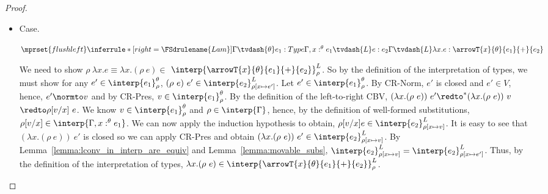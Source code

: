 \begin{proof}
\begin{itemize}
  \item[]Case.\ \\
    \begin{center}
      \begin{math}
        $$\mprset{flushleft}
        \inferrule* [right=\FSdrulename{Lam}] {
          \Gamma \tvdash{\theta} e_1:Type
          \\\\
          \Gamma,x:^\theta e_1 \tvdash{L} e:e_2
        }{\Gamma \tvdash{L} \lambda x.e:\arrowT{x}{\theta}{e_1}{+}{e_2}}
      \end{math}
    \end{center}
    We need to show 
    $\rho\ \lambda x.e \equiv \lambda x.(\rho\ e) \in $
    $\interp{\arrowT{x}{\theta}{e_1}{+}{e_2}}^{L}_\rho$.  So by the
    definition of the interpretation of types, we must show for any
    $e' \in \interp{e_1}^\theta_\rho$, $(\rho\ e)\ e' \in
    \interp{e_2}^{L}_{\rho[x \mapsto e']}$.  Let $e' \in \interp{e_1}^\theta_\rho$. 
    By CR-Norm, $e'$ is closed and $e' \in V$, hence, $e' \normto v$ and
    by CR-Pres, $v \in \interp{e_1}^\theta_{\rho}$.  By the definition of the
    left-to-right CBV, $(\lambda x.(\rho\ e))\ e' \redto^* (\lambda x.(\rho\ e))\ v $
    $\redto \rho[v/x]\ e$.  We
    know $v \in \interp{e_1}^\theta_\rho$ and $\rho \in
    \interp{\Gamma}$, hence, by the definition of well-formed
    substitutions, $\rho[v/x] \in \interp{\Gamma,x:^\theta e_1}$.  We can now apply the
    induction hypothesis to obtain, $\rho[v/x]e \in
    \interp{e_2}^L_{\rho[x \mapsto v]}$. It is easy to see that $(\lambda
    x.(\rho\ e))\ e'$ is closed so we can apply CR-Pres and
    obtain $(\lambda x.(\rho\ e))\ e' \in
    \interp{e_2}^L_{\rho[x \mapsto v]}$.  By 
    Lemma~\ref{lemma:lconv_in_interp_are_equiv} and Lemma~\ref{lemma:movable_subs},
    $\interp{e_2}^L_{\rho[x \mapsto v]} = \interp{e_2}^L_{\rho[x \mapsto e']}$.
    Thus, by the definition of the
    interpretation of types, $\lambda x.(\rho\ e) \in
    \interp{\arrowT{x}{\theta}{e_1}{+}{e_2}}^{L}_\rho$.


\end{itemize}
\end{proof}
